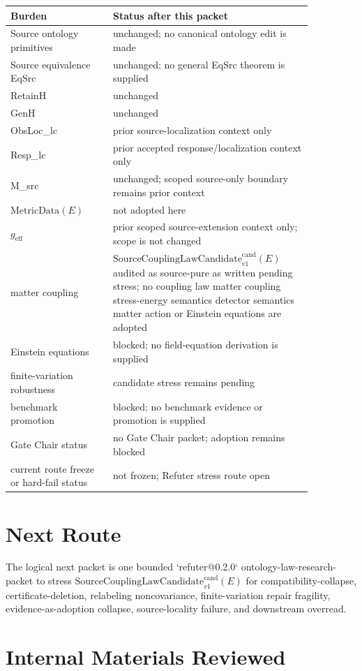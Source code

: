\documentclass[11pt]{article}
\newcommand{\MetricData}{\mathrm{MetricData}}
\newcommand{\geff}{g_{\mathrm{eff}}}
\newcommand{\SourceCoupCand}{\mathrm{SourceCouplingLawCandidate}^{\mathrm{cand}}_{v1}}
\begin{document}
\begin{longtable}{p{0.30\linewidth}p{0.56\linewidth}}
\toprule
Burden & Status after this packet \\
\midrule
Source ontology primitives & unchanged; no canonical ontology edit is made \\
Source equivalence EqSrc & unchanged; no general EqSrc theorem is supplied \\
RetainH & unchanged \\
GenH & unchanged \\
ObsLoc\_lc & prior source-localization context only \\
Resp\_lc & prior accepted response/localization context only \\
M\_src & unchanged; scoped source-only boundary remains prior context \\
\(\MetricData(E)\) & not adopted here \\
\(\geff\) & prior scoped source-extension context only; scope is not changed \\
matter coupling & \(\SourceCoupCand(E)\) audited as source-pure as written pending stress; no coupling law matter coupling stress-energy semantics detector semantics matter action or Einstein equations are adopted \\
Einstein equations & blocked; no field-equation derivation is supplied \\
finite-variation robustness & candidate stress remains pending \\
benchmark promotion & blocked; no benchmark evidence or promotion is supplied \\
Gate Chair status & no Gate Chair packet; adoption remains blocked \\
current route freeze or hard-fail status & not frozen; Refuter stress route open \\
\bottomrule
\end{longtable}

\section{Next Route}

The logical next packet is one bounded `refuter@0.2.0`
ontology-law-research-packet to stress \(\SourceCoupCand(E)\) for
compatibility-collapse, certificate-deletion, relabeling noncovariance,
finite-variation repair fragility, evidence-as-adoption collapse,
source-locality failure, and downstream overread.

\section{Internal Materials Reviewed}
\end{document}
